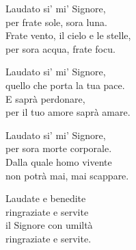 
\strofa Laudato si' mi' Signore,\\
per frate sole, sora luna.\\
Frate vento, il cielo e le stelle,\\
per sora acqua, frate focu.

\spazio


\spazio

\strofa Laudato si' mi' Signore,\\
quello che porta la tua pace.\\
E saprà perdonare,\\
per il tuo amore saprà amare.

\spazio

 

\spazio

\strofa Laudato si' mi' Signore,\\
per sora morte corporale.\\
Dalla quale homo vivente\\
non potrà mai, mai scappare.

\spazio

 

\spazio

\strofa  Laudate e benedite\\
ringraziate e servite\\
il Signore con umiltà\\
ringraziate e servite.

\spazio

 